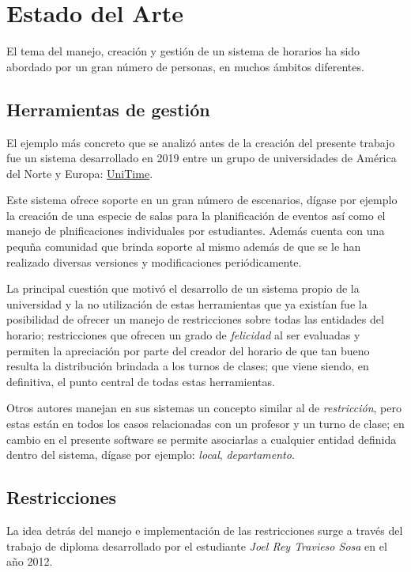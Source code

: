 \chapter{Estado del Arte}\label{chapter:state_of_the_art}

El tema del manejo, creación y gestión de un sistema de horarios ha sido abordado por un gran número de personas, en muchos ámbitos diferentes.

\section{Herramientas de gestión}
El ejemplo más concreto que se analizó antes de la creación del presente trabajo fue un sistema desarrollado en 2019 entre un grupo de universidades de América del Norte y Europa: \href{https://www.unitime.org/}{UniTime}. 

Este sistema ofrece soporte en un gran número de escenarios, dígase por ejemplo la creación de una especie de salas para la planificación de eventos así como el manejo de plnificaciones individuales por estudiantes. Además cuenta con una pequña comunidad que brinda soporte al mismo además de que se le han realizado diversas versiones y modificaciones periódicamente.

La principal cuestión que motivó el desarrollo de un sistema propio de la universidad y la no utilización de estas herramientas que ya existían fue la posibilidad de ofrecer un manejo de restricciones sobre todas las entidades del horario; restricciones que ofrecen un grado de \emph{felicidad} al ser evaluadas y permiten la apreciación por parte del creador del horario de que tan bueno resulta la distribución brindada a los turnos de clases; que viene siendo, en definitiva, el punto central de todas estas herramientas. 

Otros autores manejan en sus sistemas un concepto similar al de \emph{restricción}, pero estas están en todos los casos relacionadas con un profesor y un turno de clase; en cambio en el presente software se permite asociarlas a cualquier entidad definida dentro del sistema, dígase por ejemplo: \emph{local}, \emph{departamento}.

\section{Restricciones}
La idea detrás del manejo e implementación de las restricciones surge a través del trabajo de diploma desarrollado por el estudiante \textit{Joel Rey Travieso Sosa} en el año 2012. 

